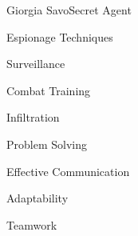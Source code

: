 \documentclass{article}
\begin{document}
\begin{cv}[avatar]{Giorgia Savo}{Secret Agent}
\begin{cvitem}
    Espionage Techniques
\end{cvitem}

\cvseparator
\begin{cvitem}
    Surveillance
\end{cvitem}

\cvseparator
\begin{cvitem}
    Combat Training
\end{cvitem}

\cvseparator
\begin{cvitem}
    Infiltration
\end{cvitem}

\cvseparator
\begin{cvitem}
    Problem Solving
\end{cvitem}

\cvseparator
\begin{cvitem}
    Effective Communication
\end{cvitem}

\cvseparator
\begin{cvitem}
    Adaptability
\end{cvitem}

\cvseparator
\begin{cvitem}
    Teamwork
\end{cvitem}




\end{cv}

\end{document}
